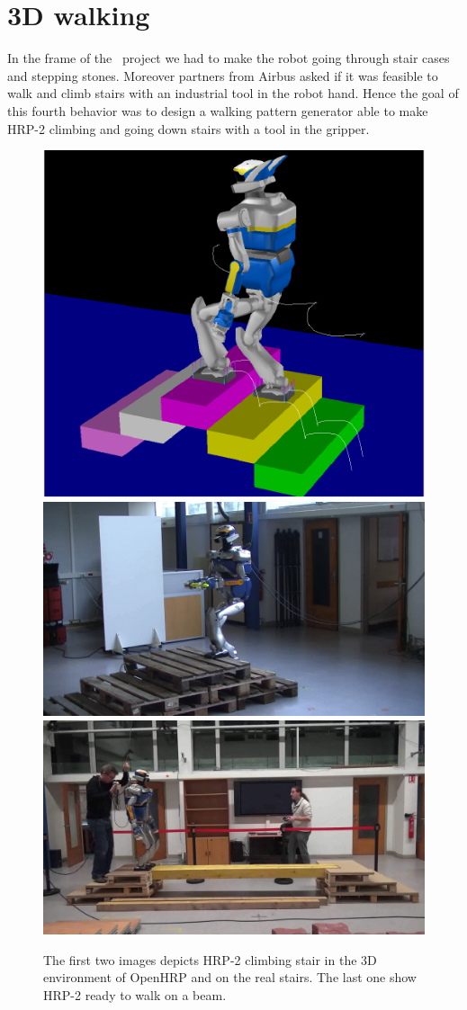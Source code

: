 \section{3D walking}

In the frame of the \koroibot\ project we had to make the robot going through stair cases and stepping stones.
Moreover partners from Airbus asked if it was feasible to walk and climb stairs with an industrial tool in the robot hand.
Hence the goal of this fourth behavior was to design a walking pattern generator able to make HRP-2 climbing and going down stairs with a tool in the gripper.

\begin{figure}[ht]
  \begin{center}
    \includegraphics[clip=true, keepaspectratio, height=0.28\linewidth]
    {./figures/PastedGraphic-2.pdf}\\[0.05cm]
    \includegraphics[clip=true, keepaspectratio, height=0.28\linewidth]
    {./figures/goinguptoolpalette.png}\hfill
    \includegraphics[clip=true, keepaspectratio, height=0.28\linewidth]
    {./figures/beam.png}   
  \end{center}
  \caption{The first two images depicts HRP-2 climbing stair in the 3D environment of OpenHRP and on the real stairs. The last one show HRP-2 ready to walk on a beam.
  }
  \label{fig:old:stairs}
\end{figure}

